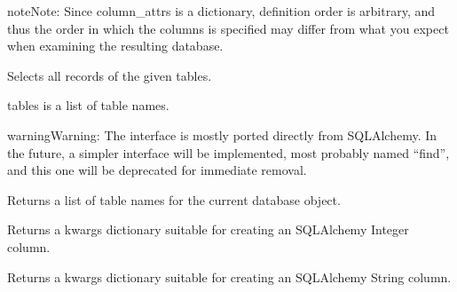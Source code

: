 \documentclass[letterpaper,10pt,english]{sphinxmanual}
\begin{document}
\begin{fulllineitems}
\begin{fulllineitems}
\begin{notice}{note}{Note:}
Since column\_attrs is a dictionary, definition order is
arbitrary, and thus the order in which the columns is
specified may differ from what you expect when examining the
resulting database.
\end{notice}

\end{fulllineitems}


\begin{fulllineitems}
\label{api_reference:vice.database.Database.select}
Selects all records of the given tables.

tables is a list of table names.

\begin{notice}{warning}{Warning:}
The interface is mostly ported directly from SQLAlchemy. In
the future, a simpler interface will be implemented, most
probably named ``find'', and this one will be deprecated for
immediate removal.
\end{notice}

\end{fulllineitems}


\begin{fulllineitems}
\label{api_reference:vice.database.Database.tables}
Returns a list of table names for the current database object.

\end{fulllineitems}


\end{fulllineitems}


\begin{fulllineitems}
\label{api_reference:vice.database.integer}
Returns a kwargs dictionary suitable for creating an SQLAlchemy
Integer column.

\end{fulllineitems}


\begin{fulllineitems}
\label{api_reference:vice.database.string}
Returns a kwargs dictionary suitable for creating an SQLAlchemy
String column.

\end{fulllineitems}
\end{document}
